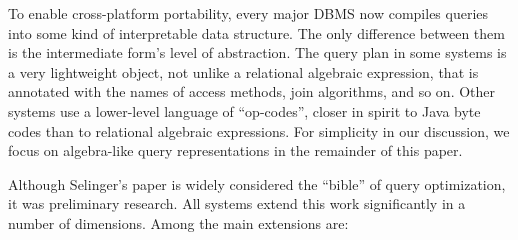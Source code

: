 \documentclass[a4paper,11pt,twoside,openright]{book}
\begin{document}
To enable cross-platform portability, every major DBMS now compiles
queries into some kind of interpretable data structure. The only
difference between them is the intermediate form's level of abstraction.
The query plan in some systems is a very lightweight object, not unlike
a relational algebraic expression, that is annotated with the names of
access methods, join algorithms, and so on. Other systems use a
lower-level language of ``op-codes'', closer in spirit to Java byte
codes than to relational algebraic expressions. For simplicity in our
discussion, we focus on algebra-like query representations in the
remainder of this paper.

Although Selinger's paper is widely considered the ``bible'' of query
optimization, it was preliminary research. All systems extend this work
significantly in a number of dimensions. Among the main extensions are:
\end{document}
